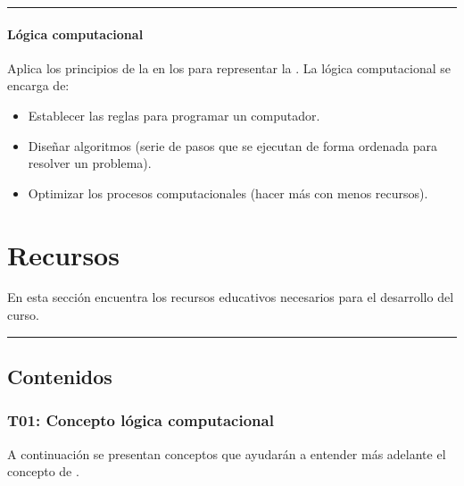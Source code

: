 \documentclass[letterpaper,10pt,spanish]{sphinxmanual}
\begin{document}
\bigskip\hrule\bigskip



\paragraph{Lógica computacional}
\label{\detokenize{cursos/logica8/periodo01/R01:logica-computacional}}
\sphinxAtStartPar
Aplica los principios de la  en los  para representar la . La lógica computacional se encarga de:
\begin{itemize}
\item {} 
\sphinxAtStartPar
Establecer las reglas para programar un computador.

\item {} 
\sphinxAtStartPar
Diseñar algoritmos (serie de pasos que se ejecutan de forma ordenada para resolver un problema).

\item {} 
\sphinxAtStartPar
Optimizar los procesos computacionales (hacer más con menos recursos).

\end{itemize}

\sphinxstepscope


\section{Recursos}
\label{\detokenize{cursos/logica8/recursos/index:recursos}}\label{\detokenize{cursos/logica8/recursos/index::doc}}
\sphinxAtStartPar
En esta sección encuentra los recursos educativos necesarios para el desarrollo del curso.


\bigskip\hrule\bigskip



\subsection{Contenidos}
\label{\detokenize{cursos/logica8/recursos/index:contenidos}}
\sphinxstepscope


\subsubsection{T01: Concepto lógica computacional}
\label{\detokenize{cursos/logica8/recursos/T01:t01-concepto-logica-computacional}}\label{\detokenize{cursos/logica8/recursos/T01::doc}}
\sphinxAtStartPar
A continuación se presentan conceptos que ayudarán a entender más adelante el concepto de .
\end{document}
